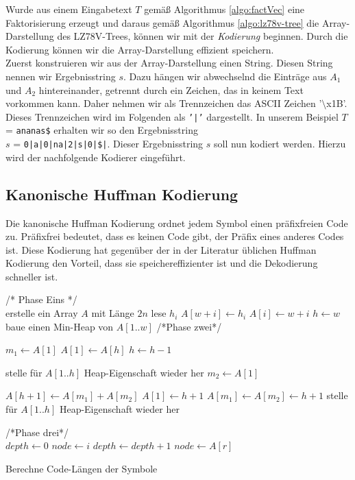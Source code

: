 \documentclass[a4paper,11pt]{scrartcl}%
\theoremstyle{change}
\theoremstyle{nonumberplain}
\theoremstyle{change}
\theoremstyle{nonumberplain}
\theoremstyle{change}
\theoremstyle{nonumberplain}
\begin{document}
Wurde aus einem Eingabetext $T$ gemäß Algorithmus \ref{algo:factVec} eine Faktorisierung erzeugt und daraus gemäß Algorithmus \ref{algo:lz78v-tree} die Array-Darstellung des LZ78V-Trees, können wir mit der \textit{Kodierung} beginnen. Durch die Kodierung können wir die Array-Darstellung effizient speichern.\\
Zuerst konstruieren wir aus der Array-Darstellung einen String. Diesen String nennen wir Ergebnisstring $s$. Dazu hängen wir abwechselnd die Einträge aus $A_1$ und $A_2$ hintereinander, getrennt durch ein Zeichen, das in keinem Text vorkommen kann. Daher nehmen wir als Trennzeichen das ASCII Zeichen '$\setminus$x1B'. Dieses Trennzeichen wird im Folgenden als \texttt{'|'} dargestellt.
In unserem Beispiel $T$ = \texttt{ananas\$} erhalten wir so den Ergebnisstring \\$s$ = \texttt{0|a|0|na|2|s|0|\$|}.
Dieser Ergebnisstring $s$ soll nun kodiert werden. Hierzu wird der nachfolgende Kodierer eingeführt.

\subsection{Kanonische Huffman Kodierung}

Die kanonische Huffman Kodierung ordnet jedem Symbol einen präfixfreien Code zu. Präfixfrei bedeutet, dass es keinen Code gibt, der Präfix eines anderes Codes ist.
Diese Kodierung hat gegenüber der in der Literatur üblichen Huffman Kodierung\cite[S. 141ff]{dataCompressionHeld} den Vorteil, dass sie speichereffizienter ist und die Dekodierung schneller ist. \cite[S. 335]{managingGigabytes}

\begin{algorithm}[t]
	\SetAlgoLined
	\SetAlgoNoEnd%
	/* Phase Eins */\\
	erstelle ein Array $A$ mit Länge $2n$\;
	 {
		lese $h_i$
		$A[w+i]\leftarrow h_i$\;
		$A[i]\leftarrow w + i$\;
	} 
	$h\leftarrow w$\;
	baue einen Min-Heap von $A[1..w]$\;
	/*Phase zwei*/\\
	 {
		$m_1 \leftarrow A[1]$\;
		$A[1] \leftarrow A[h]$\;
		$h \leftarrow h - 1$\;
		
		stelle für $A[1..h]$ Heap-Eigenschaft wieder her\;
		$m_2 \leftarrow A[1]$
		
		$A[h+1] \leftarrow A[m_1] + A[m_2]$\;
		$A[1] \leftarrow h+1$\;
		$A[m_1] \leftarrow A[m_2] \leftarrow h + 1$
		stelle für $A[1..h]$ Heap-Eigenschaft wieder her\;	
	}
	/*Phase drei*/\\
	 {
		$depth\leftarrow 0$\;
		$node\leftarrow i $\;
		 {
			$depth\leftarrow depth + 1$\;
			$node\leftarrow A[r]$\;
		}
	}


	\caption{Berechne Code-Längen der Symbole \cite[S. 341]{managingGigabytes}}
	\label{algo:huf-codeLength}
\end{algorithm}
\end{document}
